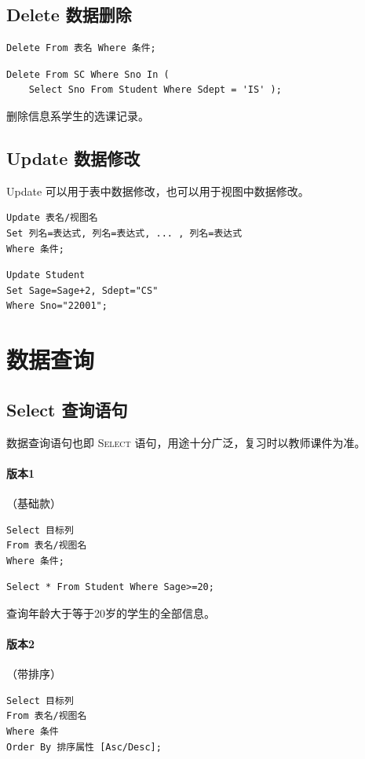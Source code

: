 \documentclass[UTF8]{ctexart}
\newcommand\kw[1]{\textsc{#1}} %
\begin{document}
\subsection{Delete 数据删除}
\begin{lstlisting}
Delete From 表名 Where 条件;
\end{lstlisting}

\begin{lstlisting}[backgroundcolor=\color{white}]
Delete From SC Where Sno In (
    Select Sno From Student Where Sdept = 'IS' );
\end{lstlisting}
删除信息系学生的选课记录。

\subsection{Update 数据修改}
Update 可以用于表中数据修改，也可以用于视图中数据修改。

\begin{lstlisting}
Update 表名/视图名
Set 列名=表达式, 列名=表达式, ... , 列名=表达式
Where 条件;
\end{lstlisting}

\begin{lstlisting}[backgroundcolor=\color{white}]
Update Student
Set Sage=Sage+2, Sdept="CS"
Where Sno="22001";
\end{lstlisting}

\section{数据查询}
\subsection{Select 查询语句}
数据查询语句也即 \kw{Select} 语句，用途十分广泛，复习时以教师课件为准。

\paragraph{版本1}（基础款）
\begin{lstlisting}
Select 目标列
From 表名/视图名
Where 条件;
\end{lstlisting}

\begin{lstlisting}[backgroundcolor=\color{white}]
Select * From Student Where Sage>=20;
\end{lstlisting}
查询年龄大于等于20岁的学生的全部信息。

\paragraph{版本2}（带排序）
\begin{lstlisting}
Select 目标列
From 表名/视图名
Where 条件
Order By 排序属性 [Asc/Desc];
\end{lstlisting}
\end{document}
